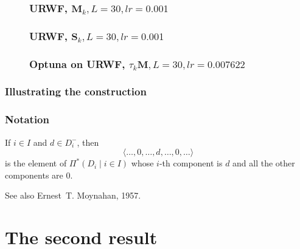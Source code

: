 \documentclass{beamer}
\theoremstyle{definition}
\theoremstyle{remark}
\begin{document}
\begin{frame}
  \begin{figure}
    \frametitle{URWF, $\boldsymbol{M}_k,L=30,lr=0.001$}
    \centering
    \resizebox{0.9\textwidth}{!}{}
    \label{fig:rwf_s_06_l_30_lr_0.001}
  \end{figure}
\end{frame}
\begin{frame}
  \begin{figure}
    \frametitle{URWF, $\boldsymbol{S}_k,L=30,lr=0.001$}
    \centering
    \resizebox{0.9\textwidth}{!}{}
    \label{fig:rwf_s_07_l_30_lr_0.001}
  \end{figure}
\end{frame}
\begin{frame}
  \begin{figure}
    \frametitle{Optuna on URWF, $\tau_k\boldsymbol{M},L=30,lr=0.007622$}
    \centering
    \resizebox{0.9\textwidth}{!}{}
    \label{fig:urwf_optuna}
  \end{figure}
\end{frame}





\begin{frame}
\frametitle{Illustrating the construction}
\end{frame}

\begin{frame}
\frametitle{Notation}

If $i \in I$ and $d \in D_{i}^{-}$, then
\[
  \langle \ldots, 0, \ldots, d, \ldots, 0, \ldots \rangle
\]
is the element of $\Pi^{*} ( D_{i} \mid i \in I )$ whose 
$i$-th component is $d$ and all the other components 
are $0$.

See also Ernest~T. Moynahan, 1957.
\end{frame}

\section[Second result]{The second result}
\end{document}
